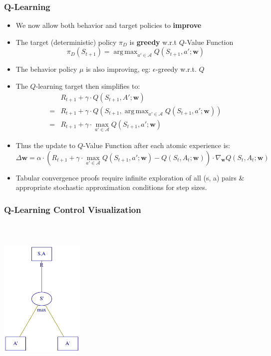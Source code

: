 \documentclass[handout]{beamer}
\DeclareMathOperator*{\argmax}{arg\,max}
\begin{document}
\begin{frame}
\frametitle{Q-Learning}
\pause
\begin{itemize}[<+->]
\item We now allow both behavior and target policies to {\bf improve}
\item The target (deterministic) policy $\pi_D$ is {\bf greedy} w.r.t $Q$-Value Function
$$\pi_D(S_{t+1}) = \argmax_{a' \in \mathcal{A}} Q(S_{t+1}, a'; \bm{w})$$
\item The behavior policy $\mu$ is also improving, eg: $\epsilon$-greedy w.r.t. $Q$
\item The $Q$-learning target then simplifies to:
\begin{align*}
& R_{t+1} + \gamma \cdot Q(S_{t+1}, A'; \bm{w}) \\
= & R_{t+1} + \gamma \cdot Q(S_{t+1}, \argmax_{a' \in \mathcal{A}} Q(S_{t+1}, a'; \bm{w})) \\
= & R_{t+1} + \gamma \cdot \max_{a' \in \mathcal{A}} Q(S_{t+1}, a'; \bm{w})
\end{align*}
\item Thus the update to $Q$-Value Function after each atomic experience is:
$$\Delta \bm{w} = \alpha \cdot (R_{t+1} + \gamma \cdot \max_{a' \in \mathcal{A}} Q(S_{t+1}, a'; \bm{w}) - Q(S_t, A_t; \bm{w})) \cdot \nabla_{\bm{w}} Q(S_t,A_t; \bm{w})$$
\item Tabular convergence proofs require infinite exploration of all (s, a) pairs \& appropriate stochastic approximation conditions for step sizes.
\end{itemize}
\end{frame}


\begin{frame}
\frametitle{Q-Learning Control Visualization}
\centerline{\includegraphics[width=4cm, height=8cm]{q_learning.png}}
\end{frame}
\end{document}
